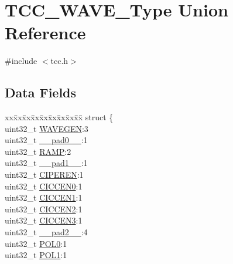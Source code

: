 \hypertarget{union_t_c_c___w_a_v_e___type}{}\section{T\+C\+C\+\_\+\+W\+A\+V\+E\+\_\+\+Type Union Reference}
\label{union_t_c_c___w_a_v_e___type}


{\ttfamily \#include $<$tcc.\+h$>$}

\subsection*{Data Fields}
\begin{DoxyCompactItemize}
\item 
\begin{tabbing}
xx\=xx\=xx\=xx\=xx\=xx\=xx\=xx\=xx\=\kill
struct \{\\
\>uint32\_t \mbox{\hyperlink{union_t_c_c___w_a_v_e___type_a7030a93e0ff908875ce45f858ab9f153}{WAVEGEN}}:3\\
\>uint32\_t \mbox{\hyperlink{union_t_c_c___w_a_v_e___type_a3e57c2ef1c3ffb36722f000cc1156824}{\_\_pad0\_\_}}:1\\
\>uint32\_t \mbox{\hyperlink{union_t_c_c___w_a_v_e___type_a4fbc88e139ecceeb359d192143bd66c6}{RAMP}}:2\\
\>uint32\_t \mbox{\hyperlink{union_t_c_c___w_a_v_e___type_a6712ba6dd1d5b43d2d56ff8ac4e275a7}{\_\_pad1\_\_}}:1\\
\>uint32\_t \mbox{\hyperlink{union_t_c_c___w_a_v_e___type_a6f7bb6fee6d010acb568b412a50fc2d1}{CIPEREN}}:1\\
\>uint32\_t \mbox{\hyperlink{union_t_c_c___w_a_v_e___type_a3b92f8ec845806676bf3dc3401ef2fce}{CICCEN0}}:1\\
\>uint32\_t \mbox{\hyperlink{union_t_c_c___w_a_v_e___type_a36a05a184681fe32e04afaf58899deb2}{CICCEN1}}:1\\
\>uint32\_t \mbox{\hyperlink{union_t_c_c___w_a_v_e___type_a6d260c6419d0be20b8f3bcf233aac689}{CICCEN2}}:1\\
\>uint32\_t \mbox{\hyperlink{union_t_c_c___w_a_v_e___type_aaa449eaa71d50b2a675b87ccf6ca8b57}{CICCEN3}}:1\\
\>uint32\_t \mbox{\hyperlink{union_t_c_c___w_a_v_e___type_a9ce12a63de64ef64ae2d59d128251cae}{\_\_pad2\_\_}}:4\\
\>uint32\_t \mbox{\hyperlink{union_t_c_c___w_a_v_e___type_a7c28ffa67e2b8e802d7a8a33ebf93a1a}{POL0}}:1\\
\>uint32\_t \mbox{\hyperlink{union_t_c_c___w_a_v_e___type_a4d9110f24a9dd66a011600c6b4bbdb04}{POL1}}:1\\

\end{tabbing}
\end{DoxyCompactItemize}
